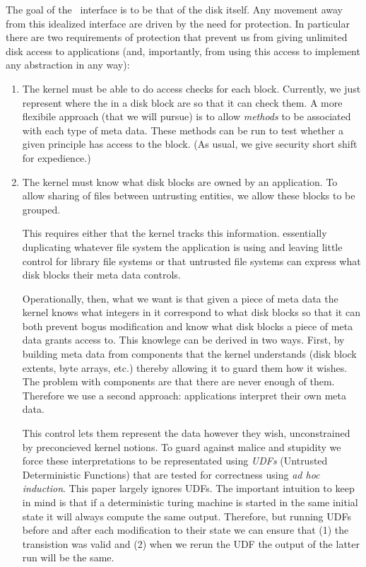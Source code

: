 The goal of the \xxx\ interface is to be that of the disk itself.
Any movement away from this idealized interface are driven by the
need for protection.  In particular there are two requirements
of protection that prevent us from giving unlimited disk access
to applications (and, importantly, from using this access to implement
any abstraction in any way):
\begin{enumerate}
	\item The kernel must be able to do access checks for each
	block.  Currently, we just represent where the in a disk
	block are so that it can check them.  A more flexibile
	approach (that we will pursue) is to allow {\em methods}
	to be associated with each type of meta data.  These methods
	can be run to test whether a given principle has access
	to the block.  (As usual, we give security short shift
	for expedience.)
	
	\item The kernel must know what disk blocks are owned by an
	application.  To allow sharing of files between untrusting
	entities, we allow these blocks to be grouped.

	This requires either that the kernel tracks this information.
	essentially duplicating whatever file system the application is
	using and leaving little control for library file systems or
	that untrusted file systems can express what disk blocks their
	meta data controls. 

	Operationally, then, what we want is that given a piece of meta
	data the kernel knows what integers in it correspond to what
	disk blocks so that it can both prevent bogus modification and
	know what disk blocks a piece of meta data grants access to.
	This knowlege can be derived in two ways.  First, by building
	meta data from components that the kernel understands (disk
	block extents, byte arrays, etc.) thereby allowing it to guard
	them how it wishes.  The problem with components are that there
	are never enough of them.  Therefore we use a second approach:
	applications interpret their own meta data.

	This control lets them represent the data however they wish,
	unconstrained by preconcieved kernel notions.  To guard against
	malice and stupidity we force these interpretations to be
	representated using {\em UDFs} (Untrusted Deterministic
	Functions) that are tested for correctness using {\em ad hoc
	induction}.  This paper largely ignores UDFs.  The important
	intuition to keep in mind is that if a deterministic turing
	machine is started in the same initial state it will always
	compute the same output.  Therefore, but running UDFs before
	and after each modification to their state we can ensure that
	(1) the transistion was valid and (2) when we rerun the UDF the
	output of the latter run will be the same.

\end{enumerate}

